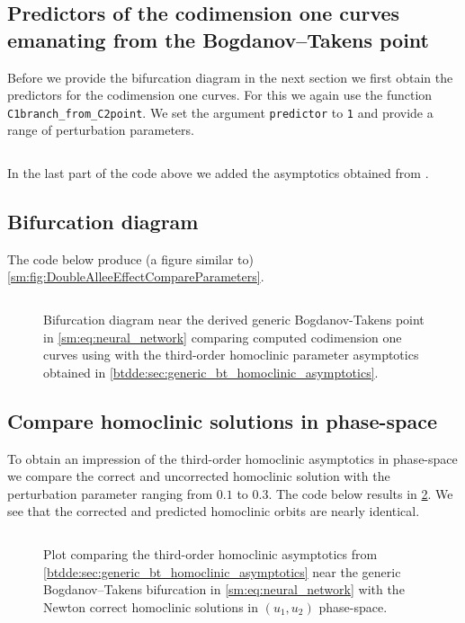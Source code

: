 \subsection{Predictors of the codimension one curves emanating from the Bogdanov--Takens point}
Before we provide the bifurcation diagram in the next section we first obtain the predictors
for the codimension one curves. For this we again use the function
\texttt{C1branch_from_C2point}. We set the argument \texttt{predictor} to \texttt{1}
and provide a range of perturbation parameters.
\inputminted[firstline=121, lastline=133]{MATLAB}{\pathToDDEBifToolDemos/neural_network_model/neural_network_model.m}
In the last part of the code above we added the asymptotics obtained from \cite{Jiao2021}.

\subsection{Bifurcation diagram}
The code below produce (a figure similar to) \cref{sm:fig:DoubleAlleeEffectCompareParameters}.
\inputminted[firstline=135, lastline=156]{MATLAB}{\pathToDDEBifToolDemos/neural_network_model/neural_network_model.m}
%
\begin{figure}[ht]
    \centering
    \caption{Bifurcation diagram near the derived generic Bogdanov-Takens point in
        \cref{sm:eq:neural_network} comparing computed codimension one curves using
        \DDEBIFTOOL with the third-order homoclinic parameter asymptotics obtained
        in \cref{btdde:sec:generic_bt_homoclinic_asymptotics}.}
    \label{sm:fig:NeuralNetworkCompareParameters}
\end{figure}

\subsection{Compare homoclinic solutions in phase-space}
To obtain an impression of the third-order homoclinic asymptotics in
phase-space we compare the correct and uncorrected homoclinic solution
with the perturbation parameter ranging from $0.1$ to $0.3$.
The code below results in \cref{sm:fig:NeuralNetworkCompareOrbitsPhaseSpace}.
We see that the corrected and predicted homoclinic orbits are nearly identical.
\inputminted[firstline=158, lastline=174]{MATLAB}{\pathToDDEBifToolDemos/neural_network_model/neural_network_model.m}
%
\begin{figure}[ht]
    \centering
    \caption{Plot comparing the third-order homoclinic asymptotics from
        \cref{btdde:sec:generic_bt_homoclinic_asymptotics} near the generic
        Bogdanov--Takens bifurcation in \cref{sm:eq:neural_network} with the
        Newton correct homoclinic solutions in $(u_1,u_2)$ phase-space.}
    \label{sm:fig:NeuralNetworkCompareOrbitsPhaseSpace}
\end{figure}

